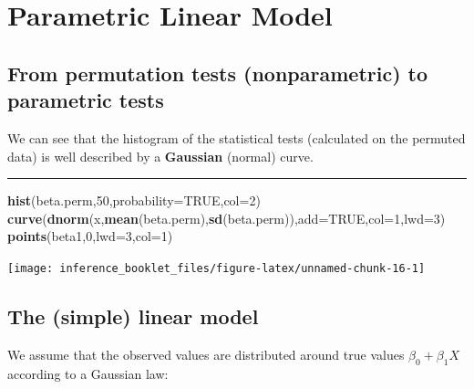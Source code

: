\documentclass[]{article}
\newenvironment{Shaded}{\begin{snugshade}}{\end{snugshade}}
\newcommand{\DataTypeTok}[1]{\textcolor[rgb]{0.13,0.29,0.53}{#1}}
\newcommand{\DecValTok}[1]{\textcolor[rgb]{0.00,0.00,0.81}{#1}}
\newcommand{\KeywordTok}[1]{\textcolor[rgb]{0.13,0.29,0.53}{\textbf{#1}}}
\newcommand{\NormalTok}[1]{#1}
\newcommand{\OtherTok}[1]{\textcolor[rgb]{0.56,0.35,0.01}{#1}}
\begin{document}
\hypertarget{parametric-linear-model}{%
\section{Parametric Linear Model}\label{parametric-linear-model}}

\hypertarget{from-permutation-tests-nonparametric-to-parametric-tests}{%
\subsection{From permutation tests (nonparametric) to parametric
tests}\label{from-permutation-tests-nonparametric-to-parametric-tests}}

We can see that the histogram of the statistical tests (calculated on
the permuted data) is well described by a \textbf{Gaussian }(normal)
curve.

\begin{center}\rule{0.5\linewidth}{\linethickness}\end{center}

\begin{Shaded}
\begin{Highlighting}[]
\KeywordTok{hist}\NormalTok{(beta.perm,}\DecValTok{50}\NormalTok{,}\DataTypeTok{probability=}\OtherTok{TRUE}\NormalTok{,}\DataTypeTok{col=}\DecValTok{2}\NormalTok{)}
\KeywordTok{curve}\NormalTok{(}\KeywordTok{dnorm}\NormalTok{(x,}\KeywordTok{mean}\NormalTok{(beta.perm),}\KeywordTok{sd}\NormalTok{(beta.perm)),}\DataTypeTok{add=}\OtherTok{TRUE}\NormalTok{,}\DataTypeTok{col=}\DecValTok{1}\NormalTok{,}\DataTypeTok{lwd=}\DecValTok{3}\NormalTok{)}
\KeywordTok{points}\NormalTok{(beta1,}\DecValTok{0}\NormalTok{,}\DataTypeTok{lwd=}\DecValTok{3}\NormalTok{,}\DataTypeTok{col=}\DecValTok{1}\NormalTok{)}
\end{Highlighting}
\end{Shaded}

\begin{center}\texttt{[image: inference\_booklet\_files/figure-latex/unnamed-chunk-16-1]} \end{center}

\hypertarget{the-simple-linear-model}{%
\subsection{The (simple) linear model}\label{the-simple-linear-model}}

We assume that the observed values are distributed around true values
\(\beta_0 + \beta_1 X\) according to a Gaussian law:
\end{document}
